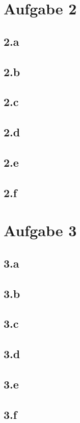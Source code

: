\documentclass{article}
\begin{document}
\section{Aufgabe 2}
\subsection{2.a}

\subsection{2.b}

\subsection{2.c}

\subsection{2.d}

\subsection{2.e}

\subsection{2.f}


\section{Aufgabe 3}
\subsection{3.a} 
\subsection{3.b}

\subsection{3.c}

\subsection{3.d}
\subsection{3.e}

\subsection{3.f}
\end{document}
